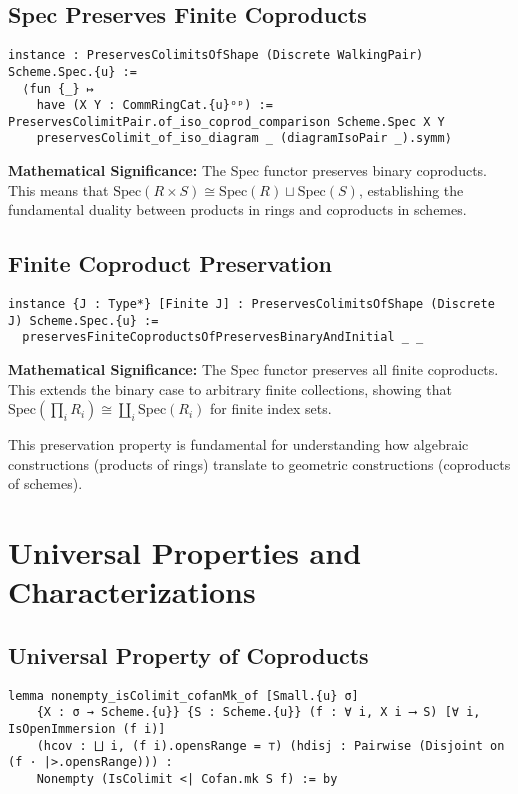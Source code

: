 \documentclass{article}
\theoremstyle{definition}
\begin{document}
\subsection{Spec Preserves Finite Coproducts}

\begin{lstlisting}
instance : PreservesColimitsOfShape (Discrete WalkingPair) Scheme.Spec.{u} :=
  ⟨fun {_} ↦
    have (X Y : CommRingCat.{u}ᵒᵖ) := PreservesColimitPair.of_iso_coprod_comparison Scheme.Spec X Y
    preservesColimit_of_iso_diagram _ (diagramIsoPair _).symm⟩
\end{lstlisting}

\textbf{Mathematical Significance:} The Spec functor preserves binary coproducts. This means that $\mathrm{Spec}(R \times S) \cong \mathrm{Spec}(R) \sqcup \mathrm{Spec}(S)$, establishing the fundamental duality between products in rings and coproducts in schemes.

\subsection{Finite Coproduct Preservation}

\begin{lstlisting}
instance {J : Type*} [Finite J] : PreservesColimitsOfShape (Discrete J) Scheme.Spec.{u} :=
  preservesFiniteCoproductsOfPreservesBinaryAndInitial _ _
\end{lstlisting}

\textbf{Mathematical Significance:} The Spec functor preserves all finite coproducts. This extends the binary case to arbitrary finite collections, showing that $\mathrm{Spec}(\prod_i R_i) \cong \coprod_i \mathrm{Spec}(R_i)$ for finite index sets.

This preservation property is fundamental for understanding how algebraic constructions (products of rings) translate to geometric constructions (coproducts of schemes).

\section{Universal Properties and Characterizations}

\subsection{Universal Property of Coproducts}

\begin{lstlisting}
lemma nonempty_isColimit_cofanMk_of [Small.{u} σ]
    {X : σ → Scheme.{u}} {S : Scheme.{u}} (f : ∀ i, X i ⟶ S) [∀ i, IsOpenImmersion (f i)]
    (hcov : ⨆ i, (f i).opensRange = ⊤) (hdisj : Pairwise (Disjoint on (f · |>.opensRange))) :
    Nonempty (IsColimit <| Cofan.mk S f) := by
\end{lstlisting}
\end{document}

